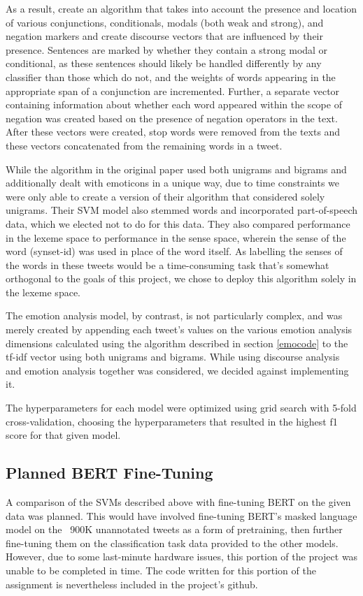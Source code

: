 \documentclass[article,oneside,a4paper,12pt]{memoir}
\begin{document}
As a result, \citeauthor{coling2012} create an algorithm that takes into account the presence and location of various conjunctions, conditionals, modals (both weak and strong), and negation markers and create discourse vectors that are influenced by their presence. Sentences are marked by whether they contain a strong modal or conditional, as these sentences should likely be handled differently by any classifier than those which do not, and the weights of words appearing in the appropriate span of a conjunction are incremented. Further, a separate vector containing information about whether each word appeared within the scope of negation was created based on the presence of negation operators in the text. After these vectors were created, stop words were removed from the texts and these vectors concatenated from the remaining words in a tweet.

While the algorithm in the original paper used both unigrams and bigrams and additionally dealt with emoticons in a unique way, due to time constraints we were only able to create a version of their algorithm that considered solely unigrams. Their SVM model also stemmed words and incorporated part-of-speech data, which we elected not to do for this data. They also compared performance in the lexeme space to performance in the sense space, wherein the sense of the word (synset-id) was used in place of the word itself. As labelling the senses of the words in these tweets would be a time-consuming task that's somewhat orthogonal to the goals of this project, we chose to deploy this algorithm solely in the lexeme space.

The emotion analysis model, by contrast, is not particularly complex, and was merely created by appending each tweet's values on the various emotion analysis dimensions calculated using the algorithm described in section \ref{emocode} to the tf-idf vector using both unigrams and bigrams. While using discourse analysis and emotion analysis together was considered, we decided against implementing it.

The hyperparameters for each model were optimized using grid search with 5-fold cross-validation, choosing the hyperparameters that resulted in the highest f1 score for that given model. 

\subsection{Planned BERT Fine-Tuning}

A comparison of the SVMs described above with fine-tuning BERT on the given data was planned. This would have involved fine-tuning BERT's masked language model on the ~900K unannotated tweets as a form of pretraining, then further fine-tuning them on the classification task data provided to the other models. However, due to some last-minute hardware issues, this portion of the project was unable to be completed in time. The code written for this portion of the assignment is nevertheless included in the project's github.
\end{document}
